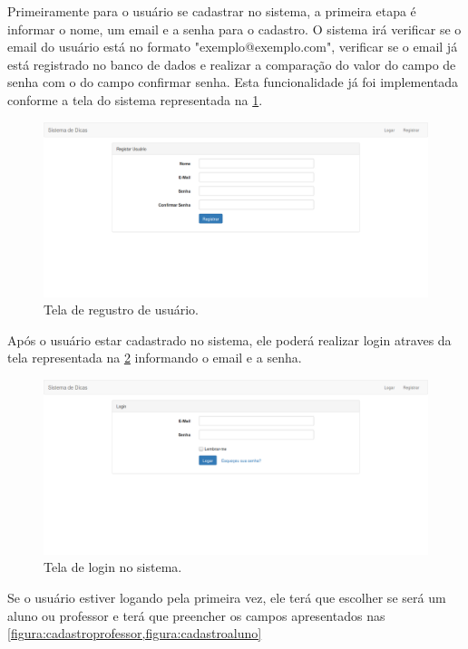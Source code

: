 Primeiramente para o usuário se cadastrar no sistema, a primeira etapa é informar o nome, um email e a senha para o cadastro. O sistema irá verificar se o email do usuário está no formato "exemplo@exemplo.com", verificar se o email já está registrado no banco de dados e realizar a comparação do valor do campo de senha com o do campo confirmar senha. Esta funcionalidade já foi implementada conforme a tela do sistema representada na \cref{figura:registrarusuario}.

\begin{figure}[]
	\captionsetup{justification=centering}
	\includegraphics[width=\linewidth]{imagenssoftware/registrarusuario.png}
	\caption{Tela de regustro de usuário.}
	\label{figura:registrarusuario}
\end{figure}

Após o usuário estar cadastrado no sistema, ele poderá realizar login atraves da tela representada na \cref{figura:logar} informando o email e a senha.

\begin{figure}[]
	\captionsetup{justification=centering}
	\includegraphics[width=\linewidth]{imagenssoftware/logar.png}
	\caption{Tela de login no sistema.}
	\label{figura:logar}
\end{figure}

Se o usuário estiver logando pela primeira vez, ele terá que escolher se será um aluno ou professor e terá que preencher os campos apresentados nas \cref{figura:cadastroprofessor,figura:cadastroaluno}

